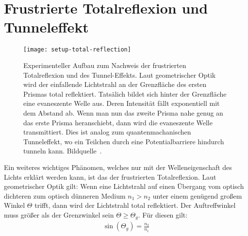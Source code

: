 \documentclass[a4paper,10pt,twocolumn]{article}
\begin{document}
    \section{Frustrierte Totalreflexion und Tunneleffekt}
    
    \begin{figure}[htbp]
        \texttt{[image: setup-total-reflection]}
        \centering
        \caption{
        Experimenteller Aufbau zum Nachweis der frustrierten Totalreflexion und des Tunnel-Effekts.
        Laut geometrischer Optik wird der einfallende Lichtstrahl an der Grenzfläche des ersten Prismas
        total reflektiert.
        Tatsälich bildet sich hinter der Grenzfläche eine evaneszente Welle aus.
        Deren Intensität fällt exponentiell mit dem Abstand ab.
        Wenn man nun das zweite Prisma nahe genug an das erste Prisma heranschiebt, dann wird die evaneszente
        Welle transmittiert.
        Dies ist analog zum quantenmachanischen Tunneleffekt, wo ein Teilchen durch eine Potentialbarriere
        hindurch tunneln kann.
        Bildquelle~\cite{instr}.
        }
        \label{fig:SetupTotalReflection}
    \end{figure}
    

    
    Ein weiteres wichtiges Phänomen, welches nur mit der Welleneigenschaft des Lichts erklärt werden kann,
    ist das der frustrierten Totalreflexion.
    Laut geometrischer Optik gilt: Wenn eine Lichtstrahl auf einen Übergang vom optisch dichteren
    zum optisch dünneren Medium $n_1 > n_2$ unter einem genügend großem Winkel $\Theta$ trifft,
    dann wird der Lichtstrahl total reflektiert.
    Der Auftreffwinkel muss größer als der Grenzwinkel sein $\Theta \geq \Theta_g$.
    Für diesen gilt:
    \begin{align*}
        \sin(\Theta_g) = \frac{n_2}{n_1}
    \end{align*}
    
\end{document}
